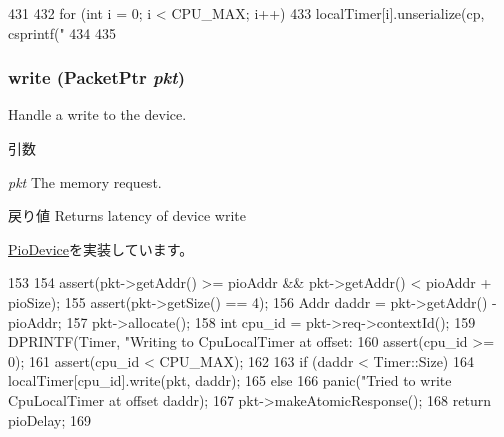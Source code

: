 \begin{DoxyCode}
431 {
432     for (int i = 0; i < CPU_MAX; i++) {
433         localTimer[i].unserialize(cp, csprintf("%
434     }
435 }
\end{DoxyCode}
\hypertarget{classCpuLocalTimer_a4cefab464e72b5dd42c003a0a4341802}{
\subsubsection[{write}]{ write ({\bf PacketPtr} {\em pkt})}}
\label{classCpuLocalTimer_a4cefab464e72b5dd42c003a0a4341802}
Handle a write to the device. 
\begin{DoxyParams}{引数}
\item[{\em pkt}]The memory request. \end{DoxyParams}
\begin{DoxyReturn}{戻り値}
Returns latency of device write 
\end{DoxyReturn}


\hyperlink{classPioDevice_afe8371668d023bb2516b286e5e399b6f}{PioDevice}を実装しています。


\begin{DoxyCode}
153 {
154     assert(pkt->getAddr() >= pioAddr && pkt->getAddr() < pioAddr + pioSize);
155     assert(pkt->getSize() == 4);
156     Addr daddr = pkt->getAddr() - pioAddr;
157     pkt->allocate();
158     int cpu_id = pkt->req->contextId();
159     DPRINTF(Timer, "Writing to CpuLocalTimer at offset: %
160     assert(cpu_id >= 0);
161     assert(cpu_id < CPU_MAX);
162 
163     if (daddr < Timer::Size)
164         localTimer[cpu_id].write(pkt, daddr);
165     else
166         panic("Tried to write CpuLocalTimer at offset %
      daddr);
167     pkt->makeAtomicResponse();
168     return pioDelay;
169 }
\end{DoxyCode}


